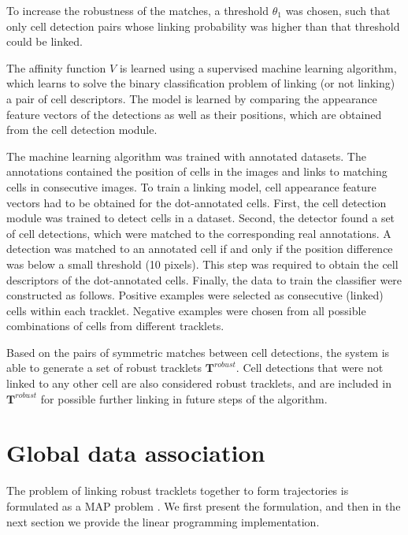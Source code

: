 		To increase the robustness of the matches, a threshold $\theta_1$ was chosen, such that only cell detection pairs whose linking probability was higher than that threshold could be linked.
		
		The affinity function $V$ is learned using a supervised machine learning algorithm, which learns to solve the binary classification problem of linking (or not linking) a pair of cell descriptors. The model is learned by comparing the appearance feature vectors of the detections as well as their positions, which are obtained from the cell detection module.

		
		The machine learning algorithm was trained with annotated datasets. The annotations contained the position of cells in the images and links to matching cells in consecutive images. To train a linking model, cell appearance feature vectors had to be obtained for the dot-annotated cells. First, the cell detection module was trained to detect cells in a dataset. Second, the detector found a set of cell detections, which were matched to the corresponding real annotations. A detection was matched to an annotated cell if and only if the position difference was below a small threshold (10 pixels). This step was required to obtain the cell descriptors of the dot-annotated cells. Finally, the data to train the classifier were constructed as follows. Positive examples were selected as consecutive (linked) cells within each tracklet. Negative examples were chosen from all possible combinations of cells from different tracklets.
		

		Based on the pairs of symmetric matches between cell detections, the system is able to generate a set of robust tracklets $\textbf{T}^{robust}$. Cell detections that were not linked to any other cell are also considered robust tracklets, and are included in $\textbf{T}^{robust}$ for possible further linking in future steps of the algorithm.
		
	\section{Global data association \statusfirstdraft}
		\label{sec:globaldataassoc}
		The problem of linking robust tracklets together to form trajectories is formulated as a MAP problem \cite{bise11global,zhang08,huang08}. We first present the formulation, and then in the next section we provide the linear programming implementation.
		
